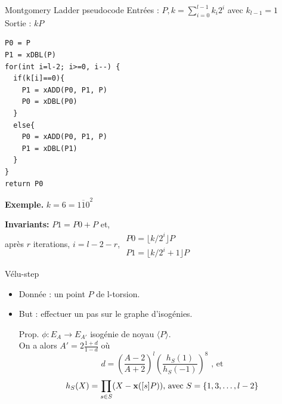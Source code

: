 \documentclass{beamer}
\begin{document}
\begin{frame}[fragile]{Montgomery Ladder pseudocode}
	\small	Entrées : $P, k = \sum_{i=0}^{l-1}k_i 2^i$ avec $k_{l-1}=1$\\
	Sortie : $kP$
\begin{verbatim}
P0 = P
P1 = xDBL(P)
for(int i=l-2; i>=0, i--) {
  if(k[i]==0){
    P1 = xADD(P0, P1, P)
    P0 = xDBL(P0)
  }
  else{
    P0 = xADD(P0, P1, P)
    P1 = xDBL(P1)
  }
}
return P0
\end{verbatim}
\end{frame}

\begin{frame}
	\textbf{Exemple.} $k=6=\overline{110}^2$\\
	\begin{center}
	\end{center}
\textbf{Invariants:} $P1 = P0+P$ et,\\ après $r$ iterations, $i=l-2-r$, 
$\begin{array}{l}P0 = \lfloor k/2^i\rfloor P \\ P1 = \lfloor k/2^i + 1\rfloor P\end{array}$
\end{frame}

\begin{frame}[fragile]{Vélu-step}
\begin{itemize}
	\item Donnée : un point $P$ de l-torsion.
	\item But : effectuer un pas sur le graphe d'isogénies.
	\item[Prop.]{$\phi:E_A\rightarrow E_{A'}$ isogénie de noyau $\langle P \rangle$.\\
		On a alors $\boxed{A'=2\frac{1+d}{1-d}}$ où\\
		\[d = \left(\frac{A-2}{A+2}\right)^l \left( \frac{h_S(1)}{h_S(-1)}\right)^8 \text{ , et}\]
			\[h_S(X) = \prod_{s\in S}(X-\textbf{x}([s]P))\text{, avec }S=\{1,3, \ldots, l-2\}\]}
\end{itemize}
\end{frame}
\end{document}
